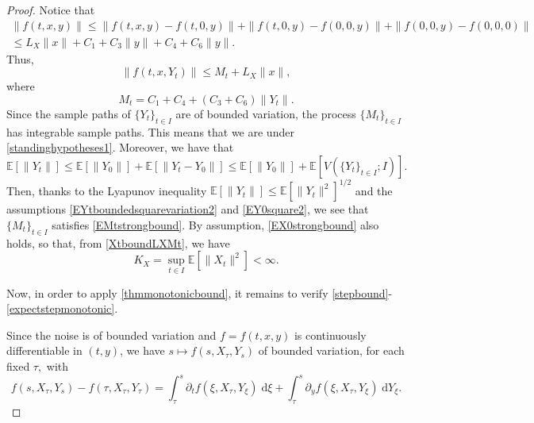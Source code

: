 \documentclass[reqno,12pt]{amsart}
\theoremstyle{plain} %
\theoremstyle{definition} %
\begin{document}
\begin{proof}
    Notice that
    \begin{multline*}
        \|f(t, x, y)\| \leq \|f(t, x, y) - f(t, 0, y)\| + \|f(t, 0, y) - f(0, 0, y)\| + \|f(0, 0, y) - f(0, 0, 0)\| \\
        \leq L_X \|x\| + C_1 + C_3\|y\| + C_4 + C_6\|y\|. 
    \end{multline*}
    Thus,
    \[
        \|f(t, x, Y_t)\| \leq M_t + L_X \|x\|,
    \]
    where
    \[
        M_t = C_1 + C_4 + (C_3 + C_6)\|Y_t\|.
    \]
    Since the sample paths of $\{Y_t\}_{t\in I}$ are of bounded variation, the process $\{M_t\}_{t\in I}$ has integrable sample paths. This means that we are under \cref{standinghypotheses1}. Moreover, we have that
    \[
        \mathbb{E}[\|Y_t\|] \leq \mathbb{E}[\|Y_0\|] + \mathbb{E}[\|Y_t - Y_0\|] \leq \mathbb{E}[\|Y_0\|] + \mathbb{E}[V(\{Y_t\}_{t\in I}; I)].
    \]
    Then, thanks to the Lyapunov inequality $\mathbb{E}[\|Y_t\|] \leq \mathbb{E}[\|Y_t\|^2]^{1/2}$ and the assumptions \eqref{EYtboundedsquarevariation2} and \eqref{EY0square2}, we see that $\{M_t\}_{t\in I}$ satisfies \eqref{EMtstrongbound}. By assumption, \eqref{EX0strongbound} also holds, so that, from \eqref{XtboundLXMt}, we have
    \[
        K_X = \sup_{t\in I}\mathbb{E}[\|X_t\|^2] < \infty.
    \]

    Now, in order to apply \cref{thmmonotonicbound}, it remains to verify \eqref{stepbound}-\eqref{expectstepmonotonic}.

    Since the noise is of bounded variation and $f=f(t, x, y)$ is continuously differentiable in $(t, y)$, we have $s\mapsto f(s, X_\tau, Y_s)$ of bounded variation, for each fixed $\tau,$ with
    \[
        f(s, X_\tau, Y_s) - f(\tau, X_\tau, Y_\tau) = \int_\tau^s \partial_t f(\xi, X_\tau, Y_\xi) \;\mathrm{d}\xi + \int_\tau^s \partial_y f(\xi, X_\tau, Y_\xi) \;\mathrm{d} Y_\xi.
    \]


\end{proof}
\end{document}
